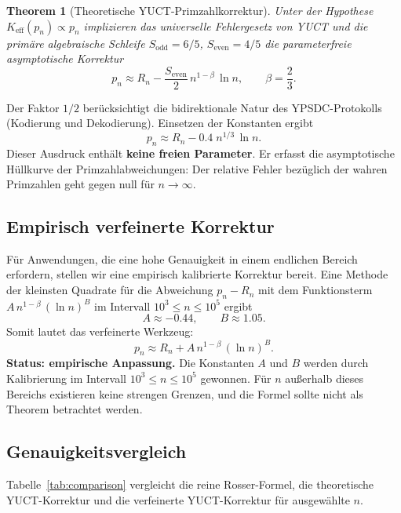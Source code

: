 \documentclass[11pt,a4paper]{article}
\newtheorem{theorem}{Theorem}
\newcommand{\Sodd}{S_{\mathrm{odd}}}
\newcommand{\Seven}{S_{\mathrm{even}}}
\begin{document}
	\begin{theorem}[Theoretische YUCT-Primzahlkorrektur]\label{thm:yuct-prime-theory}
		Unter der Hypothese \(K_{\mathrm{eff}}(p_n) \propto p_n\) implizieren das universelle Fehlergesetz von YUCT und die primäre algebraische Schleife \(\Sodd=6/5\), \(\Seven=4/5\) die parameterfreie asymptotische Korrektur
		\begin{equation}\label{eq:yuct-prime-theory}
			\boxed{ p_n \approx R_n - \frac{\Seven}{2}\, n^{1-\beta}\,\ln n },
			\qquad \beta = \frac{2}{3}.
		\end{equation}
	\end{theorem}
	
	Der Faktor \(1/2\) berücksichtigt die bidirektionale Natur des YPSDC-Protokolls (Kodierung und Dekodierung). Einsetzen der Konstanten ergibt
	\[
	p_n \approx R_n - 0.4\; n^{1/3}\,\ln n .
	\]
	Dieser Ausdruck enthält \textbf{keine freien Parameter}. Er erfasst die asymptotische Hüllkurve der Primzahlabweichungen: Der relative Fehler bezüglich der wahren Primzahlen geht gegen null für \(n\to\infty\).
	
	\subsection{Empirisch verfeinerte Korrektur}
	Für Anwendungen, die eine hohe Genauigkeit in einem endlichen Bereich erfordern, stellen wir eine empirisch kalibrierte Korrektur bereit. Eine Methode der kleinsten Quadrate für die Abweichung \(p_n - R_n\) mit dem Funktionsterm \(A\,n^{1-\beta}\,(\ln n)^B\) im Intervall \(10^3 \le n \le 10^5\) ergibt
	\[
	A \approx -0.44, \qquad B \approx 1.05.
	\]
	Somit lautet das verfeinerte Werkzeug:
	\begin{equation}\label{eq:yuct-prime-empirical}
		\boxed{ p_n \approx R_n + A\,n^{1-\beta}\,(\ln n)^B }.
	\end{equation}
	\textbf{Status: empirische Anpassung.} Die Konstanten \(A\) und \(B\) werden durch Kalibrierung im Intervall \(10^3 \le n \le 10^5\) gewonnen. Für \(n\) außerhalb dieses Bereichs existieren keine strengen Grenzen, und die Formel sollte nicht als Theorem betrachtet werden.
	
	\subsection{Genauigkeitsvergleich}
	Tabelle~\ref{tab:comparison} vergleicht die reine Rosser-Formel, die theoretische YUCT-Korrektur und die verfeinerte YUCT-Korrektur für ausgewählte \(n\).
	
\end{document}
